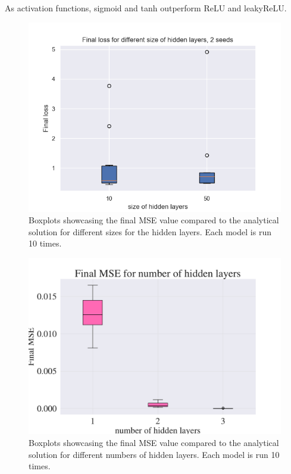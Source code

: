 As activation functions, sigmoid and tanh outperform ReLU and leakyReLU. 

\begin{figure}[h!]
    \centering
    \includegraphics[width=1.0\linewidth]{project_3/plots/value_layers_search.png}
    \caption{Boxplots showcasing the final MSE value compared to the analytical solution for different sizes for the hidden layers. Each model is run 10 times. }
    \label{fig:boxplots_size_of_layers}
\end{figure}


\begin{figure}[h!]
    \centering
    \includegraphics[width=1.0\linewidth]{project_3/plots/n_layers_search.pdf}
    \caption{Boxplots showcasing the final MSE value compared to the analytical solution for different numbers of hidden layers. Each model is run 10 times.}
    \label{fig:boxplots_number_of_hidden_layers}
\end{figure}
